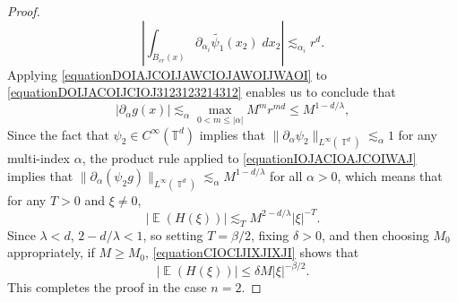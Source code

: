 \documentclass[dvipsnames,letterpaper,12pt]{article}
\numberwithin{equation}{section}
\DeclareMathOperator{\TT}{\mathbb{T}}
\numberwithin{theorem}{section}
\DeclareMathOperator{\EE}{\mathbb{E}}
\begin{document}
\begin{proof}
    \begin{equation} \label{equationDOIAJCOIJAWCIOJAWOIJWAOI}
        \left| \int_{B_{cr}(x)} \partial_{\alpha_i} \tilde{\psi_1}(x_2)\; dx_2 \right| \lesssim_{\alpha_i} r^d.
    \end{equation}
    Applying \eqref{equationDOIAJCOIJAWCIOJAWOIJWAOI} to \eqref{equationDOIJACOIJCIOJ3123123214312} enables us to conclude that
    \begin{equation} \label{equationIOJACIOAJCOIWAJ}
        |\partial_\alpha g(x)| \lesssim_\alpha \max_{0 < m \leq |\alpha|} M^m r^{md} \leq M^{1 - d/\lambda},
    \end{equation}
    Since the fact that $\psi_2 \in C^\infty(\mathbb{T}^d)$ implies that $\| \partial_\alpha \psi_2 \|_{L^\infty(\TT^d)} \lesssim_\alpha 1$ for any multi-index $\alpha$, the product rule applied to \eqref{equationIOJACIOAJCOIWAJ} implies that $\| \partial_\alpha (\psi_2 g) \|_{L^\infty(\TT^d)} \lesssim_\alpha M^{1 - d/\lambda}$ for all $\alpha > 0$, which means that for any $T > 0$ and $\xi \neq 0$,
    \begin{equation} \label{equationCIOCIJIXJIXJI}
        |\EE(H(\xi))| \lesssim_T M^{2 - d/\lambda} |\xi|^{-T}.
    \end{equation}
    Since $\lambda < d$, $2 - d / \lambda < 1$, so setting $T = \beta/2$, fixing $\delta > 0$, and then choosing $M_0$ appropriately, if $M \geq M_0$, \eqref{equationCIOCIJIXJIXJI} shows that
    \begin{equation}
        |\EE(H(\xi))| \leq \delta M |\xi|^{-\beta/2}.
    \end{equation}
    This completes the proof in the case $n = 2$.


\end{proof}
\end{document}
